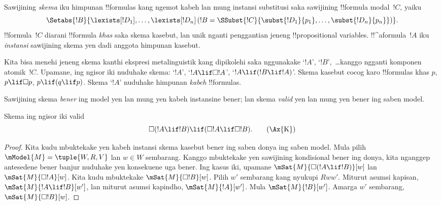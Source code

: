 \documentclass[../../../include/open-logic-section]{subfiles}
\begin{document}


\begin{defn}
  Sawijining \emph{skema} iku himpunan !!{formula}s kang ngemot kabeh
  lan mung instansi substitusi saka sawijining !!{formula} modal~$!C$, yaiku
  \[
  \Setabs{!B}{\lexists[!D_1], \dots, \lexists[!D_n] \left(!B =
  \SSubst{!C}{\subst{!D_1}{p_1}, \dots, \subst{!D_n}{p_n}} \right) }.
  \]
  !!{formula}~$!C$ diarani !!{formula} \emph{khas} saka skema
  kasebut, lan unik nganti penggantian jeneng !!{propositional
  variable}s. !!^a{formula}~$!A$ iku \emph{instansi} sawijining skema yen
  dadi anggota himpunan kasebut.
\end{defn}

Kita bisa menehi jeneng skema kanthi ekspresi metalinguistik
kang dipikolehi saka nggunakake `$!A$', `$!B$',~\dots kanggo
ngganti komponen atomik~$!C$. Upamane, ing ngisor iki nuduhake skema:
`$!A$', `$!A \lif \Box!A$', `$!A \lif (!B \lif !A)$'. Skema kasebut
cocog karo !!{formula}s khas $p$, $p \lif \Box p$, $p \lif (q
\lif p)$. Skema `$!A$' nuduhake himpunan \emph{kabeh}
!!{formula}s.

\begin{defn}
  Sawijining skema \emph{bener} ing model yen lan mung yen kabeh
  instansine bener; lan skema \emph{valid} yen lan mung yen bener ing
  saben model.
\end{defn}

\begin{prop}
  Skema  ing ngisor iki valid
  \begin{equation*}
  \Box(!A \lif !B) \lif (\Box !A \lif \Box !B). \tag{\Ax{K}}
  \end{equation*}
\end{prop}

\begin{proof}
  Kita kudu mbuktekake yen kabeh instansi skema kasebut bener ing saben
  donya ing saben model. Mula pilih $\mModel{M} = \tuple{W,R,V}$ lan $w \in
  W$ sembarang. Kanggo mbuktekake yen sawijining kondisional bener ing
  donya, kita nganggep antesedene bener banjur nuduhake yen
  konsekuene uga bener. Ing kasus iki, upamane $\mSat{M}{\Box(!A \lif !B)}[w]$
  lan $\mSat{M}{\Box !A}[w]$. Kita kudu mbuktekake $\mSat{M}{\Box !B}[w]$.
  Pilih $w'$ sembarang kang nyukupi $Rww'$. Miturut asumsi kapisan,
  $\mSat{M}{!A \lif !B}[w']$, lan miturut asumsi kapindho,
  $\mSat{M}{!A}[w']$. Mula $\mSat{M}{!B}[w']$. Amarga $w'$
  sembarang, $\mSat{M}{\Box !B}[w]$.
\end{proof}
\end{document}
